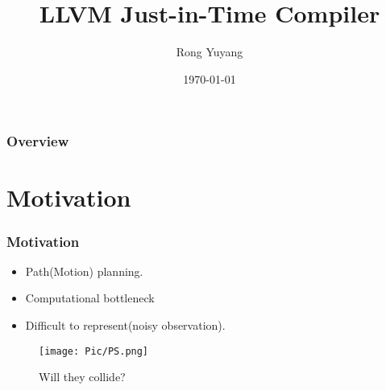 \documentclass{beamer}
\title[LLVM JIT]{LLVM Just-in-Time Compiler} %
\author{Rong Yuyang} %
\institute[SIST] %
{
ShanghaiTech University \\ %
School of Information Science and Technology(SIST) \\
\medskip
\textit{rongyy@shanghaitech.edu.cn} %
}
\date{\today} %
\begin{document}
\begin{frame}
\titlepage %
\end{frame}

\begin{frame}
\frametitle{Overview} %
\tableofcontents %
\end{frame}


\section{Motivation} %


\begin{frame}
\frametitle{Motivation}
	\begin{itemize}
	\item Path(Motion) planning.
	\item Computational bottleneck
	\item Difficult to represent(noisy observation).
	\end{itemize}
	\begin{figure}
		\texttt{[image: Pic/PS.png]}
		\caption{Will they collide?}
	\end{figure}
\end{frame}
\end{document}
